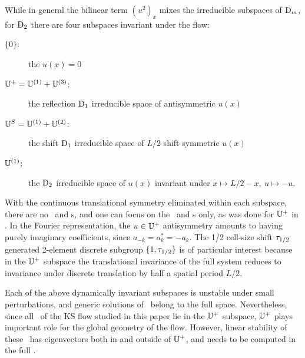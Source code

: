 While in general the bilinear term $(u^2)_x$  mixes the
irreducible subspaces of $\textrm{D}_{m}$, for $\textrm{D}_{2}$ there are
four subspaces invariant under the flow:
\begin{description}
 \item[$\{0\}$:~~~~~~] the $u(x)=0$ {\eqv}
 \item[$\mathbb{U}^+ = \mathbb{U}^{(1)}+ \mathbb{U}^{(3)} $:]
    the reflection $\textrm{D}_{1}$ irreducible space of antisymmetric $u(x)$
 \item[$\mathbb{U}^S =  \mathbb{U}^{(1)}+ \mathbb{U}^{(2)}$:]
    the shift $\textrm{D}_{1}$ irreducible space of $L/2$ shift symmetric  $u(x)$
 \item[$\mathbb{U}^{(1)}$:~~~~~]
    the $\textrm{D}_{2}$ irreducible  space of $u(x)$ invariant under $x\mapsto L/2-x,\ u\mapsto -u$.
\end{description}
With the continuous
translational symmetry eliminated within each subspace, there are no
\reqva\ and \rpo s, and one
can focus on the \eqva\ and \po s only, as was done
for $\mathbb{U}^+$ in .
In the Fourier
representation, the
$u \in \mathbb{U}^+$
antisymmetry amounts to having purely imaginary
coefficients, since $a_{-k}= a^\ast_k = -a_k$.
The 1/2 cell-size shift $\tau_{1/2}$
generated 2-element discrete subgroup
$\{1,\tau_{1/2}\}$ is
of particular interest
because in the $\mathbb{U}^+$ subspace the translational invariance of the full system reduces to
invariance under discrete translation  by half a
spatial period $L/2$.

Each of the above dynamically invariant subspaces is unstable
under small perturbations, and generic solutions of \KSe\ belong to
the full space.
Nevertheless, since  all \eqva\ of the KS flow studied in this paper
lie in the $\mathbb{U}^+$ subspace,
$\mathbb{U}^+$  plays important role for the global
geometry of the flow.
However, linear stability of these \eqva\ has
eigenvectors both in and outside of $\mathbb{U}^+$, and needs to be
computed in the full \statesp.


